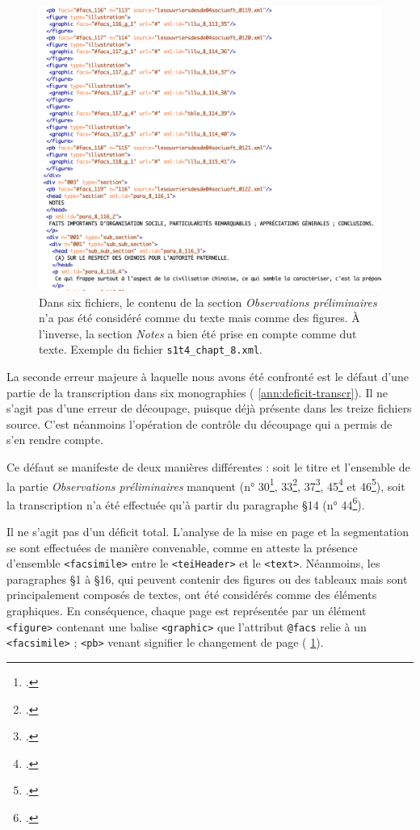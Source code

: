 \begin{figure}[t]
    \centering
    \includegraphics[width=15cm]{img/deficit_transcrip.png}
    \caption{Dans six fichiers, le contenu de la section \textit{Observations préliminaires} n'a pas été considéré comme du texte mais comme des figures. À l'inverse, la section \textit{Notes} a bien été prise en compte comme dut texte. Exemple du fichier \texttt{s1t4\_chapt\_8.xml}.}
    \label{fig:deficit}
\end{figure}

La seconde erreur majeure à laquelle nous avons été confronté est le défaut d'une partie de la transcription dans six monographies (\ann{} \ref{ann:deficit-transcr}). Il ne s'agit pas d'une erreur de découpage, puisque déjà présente dans les treize fichiers source. C'est néanmoins l'opération de contrôle du découpage qui a permis de s'en rendre compte.

Ce défaut se manifeste de deux manières différentes : soit le titre et l'ensemble de la partie \textit{Observations préliminaires} manquent (n° 30\footcite{mono030a}, 33\footcite{mono033a}, 37\footcite{mono037a}, 45\footcite{mono045a} et 46\footcite{mono046a}), soit la transcription n'a été effectuée qu'à partir du paragraphe §14 (n° 44\footcite{mono044a}).

Il ne s'agit pas d'un déficit total. L'analyse de la mise en page et la segmentation se sont effectuées de manière convenable, comme en atteste la présence d'ensemble \texttt{<facsimile>} entre le \texttt{<teiHeader>} et le \texttt{<text>}. Néanmoins, les paragraphes §1 à §16, qui peuvent contenir des figures ou des tableaux mais sont principalement composés de textes, ont été considérés comme des éléments graphiques. En conséquence, chaque page est représentée par un élément \texttt{<figure>} contenant une balise \texttt{<graphic>} que l'attribut \texttt{@facs} relie à un \texttt{<facsimile>} ; \texttt{<pb>} venant signifier le changement de page (\fig{} \ref{fig:deficit}).

